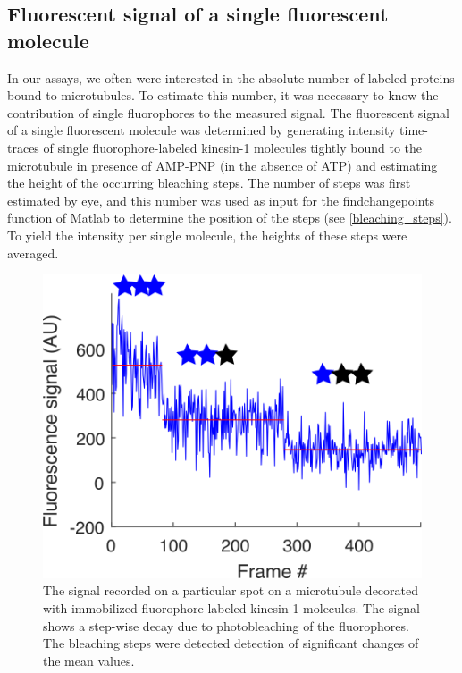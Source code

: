 \subsection{Fluorescent signal of a single fluorescent molecule} 
In our assays, we often were interested in the absolute number of labeled proteins bound to microtubules. To estimate this number, it was necessary to know the contribution of single fluorophores to the measured signal. The fluorescent signal of a single fluorescent molecule was determined by generating intensity time-traces of single fluorophore-labeled kinesin-1 molecules tightly bound to the microtubule in presence of AMP-PNP (in the absence of ATP) and estimating the height of the occurring bleaching steps. The number of steps was first estimated by eye, and this number was used as input for the findchangepoints function of Matlab to determine the position of the steps (see \autoref{bleaching_steps}). To yield the intensity per single molecule, the heights of these steps were averaged.
\begin{figure}[htb]
\centering
\includegraphics[scale=1.1]{Figures/bleaching_steps.png}
\caption[An illustration explaining our estimation of the fluorescent signal of a single fluorophore.]{
		The signal recorded on a particular spot on a microtubule decorated with immobilized fluorophore-labeled kinesin-1 molecules. The signal shows a step-wise decay due to photobleaching of the fluorophores. The bleaching steps were detected detection of significant changes of the mean values.
	}\label{bleaching_steps}
\end{figure}

